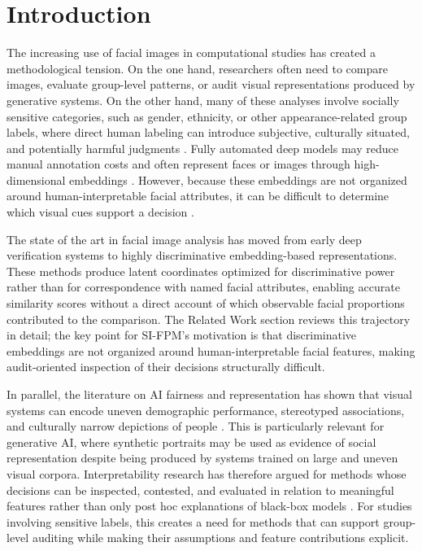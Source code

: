 \documentclass{article}
\begin{document}
\section{Introduction}
\label{introduction}

The increasing use of facial images in computational studies has created a methodological tension. On the one hand, researchers often need to compare images, evaluate group-level patterns, or audit visual representations produced by generative systems. On the other hand, many of these analyses involve socially sensitive categories, such as gender, ethnicity, or other appearance-related group labels, where direct human labeling can introduce subjective, culturally situated, and potentially harmful judgments \cite{buolamwini2018gender,mehrabi2021survey,heidari2016sager}. Fully automated deep models may reduce manual annotation costs and often represent faces or images through high-dimensional embeddings \cite{Schroff_2015_CVPR,Deng_2019_CVPR}. However, because these embeddings are not organized around human-interpretable facial attributes, it can be difficult to determine which visual cues support a decision \cite{doshivelez2017rigorousscienceinterpretablemachine,rudin2019stop,burrell2016machine}.

The state of the art in facial image analysis has moved from early deep verification systems to highly discriminative embedding-based representations. These methods produce latent coordinates optimized for discriminative power rather than for correspondence with named facial attributes, enabling accurate similarity scores without a direct account of which observable facial proportions contributed to the comparison. The Related Work section reviews this trajectory in detail; the key point for SI-FPM's motivation is that discriminative embeddings are not organized around human-interpretable facial features, making audit-oriented inspection of their decisions structurally difficult.

In parallel, the literature on AI fairness and representation has shown that visual systems can encode uneven demographic performance, stereotyped associations, and culturally narrow depictions of people \cite{buolamwini2018gender,mehrabi2021survey,luccioni2023stablebiasanalyzingsocietal, franco2026bias}. This is particularly relevant for generative AI, where synthetic portraits may be used as evidence of social representation despite being produced by systems trained on large and uneven visual corpora. Interpretability research has therefore argued for methods whose decisions can be inspected, contested, and evaluated in relation to meaningful features rather than only post hoc explanations of black-box models \cite{doshivelez2017rigorousscienceinterpretablemachine,rudin2019stop}. For studies involving sensitive labels, this creates a need for methods that can support group-level auditing while making their assumptions and feature contributions explicit.
\end{document}
